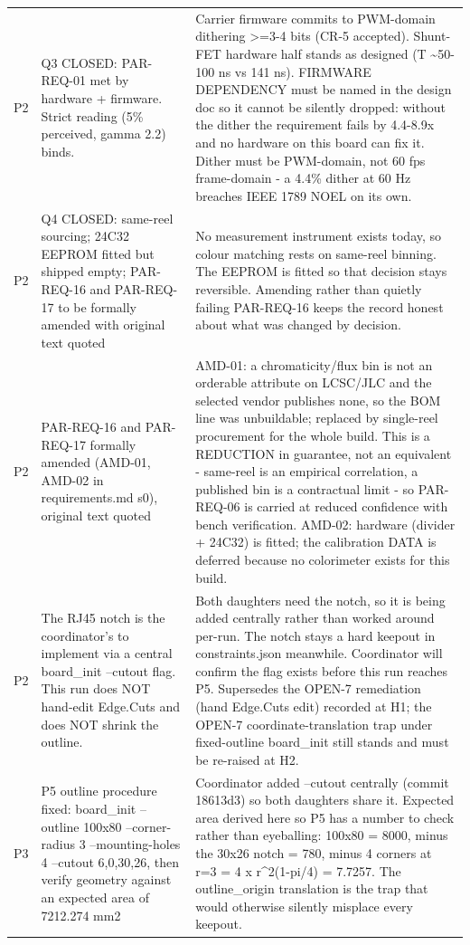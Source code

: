 \documentclass[11pt,a4paper]{article}
\begin{document}
{\begin{longtable}{lp{5.2cm}p{7.2cm}}
P2 & Q3 CLOSED: PAR-REQ-01 met by hardware + firmware. Strict reading (5\% perceived, gamma 2.2) binds. & Carrier firmware commits to PWM-domain dithering \textgreater{}=3-4 bits (CR-5 accepted). Shunt-FET hardware half stands as designed (T \textasciitilde{}50-100 ns vs 141 ns). FIRMWARE DEPENDENCY must be named in the design doc so it cannot be silently dropped: without the dither the requirement fails by 4.4-8.9x and no hardware on this board can fix it. Dither must be PWM-domain, not 60 fps frame-domain - a 4.4\% dither at 60 Hz breaches IEEE 1789 NOEL on its own. \\
P2 & Q4 CLOSED: same-reel sourcing; 24C32 EEPROM fitted but shipped empty; PAR-REQ-16 and PAR-REQ-17 to be formally amended with original text quoted & No measurement instrument exists today, so colour matching rests on same-reel binning. The EEPROM is fitted so that decision stays reversible. Amending rather than quietly failing PAR-REQ-16 keeps the record honest about what was changed by decision. \\
P2 & PAR-REQ-16 and PAR-REQ-17 formally amended (AMD-01, AMD-02 in requirements.md s0), original text quoted & AMD-01: a chromaticity/flux bin is not an orderable attribute on LCSC/JLC and the selected vendor publishes none, so the BOM line was unbuildable; replaced by single-reel procurement for the whole build. This is a REDUCTION in guarantee, not an equivalent - same-reel is an empirical correlation, a published bin is a contractual limit - so PAR-REQ-06 is carried at reduced confidence with bench verification. AMD-02: hardware (divider + 24C32) is fitted; the calibration DATA is deferred because no colorimeter exists for this build. \\
P2 & The RJ45 notch is the coordinator's to implement via a central board\_init --cutout flag. This run does NOT hand-edit Edge.Cuts and does NOT shrink the outline. & Both daughters need the notch, so it is being added centrally rather than worked around per-run. The notch stays a hard keepout in constraints.json meanwhile. Coordinator will confirm the flag exists before this run reaches P5. Supersedes the OPEN-7 remediation (hand Edge.Cuts edit) recorded at H1; the OPEN-7 coordinate-translation trap under fixed-outline board\_init still stands and must be re-raised at H2. \\
P3 & P5 outline procedure fixed: board\_init --outline 100x80 --corner-radius 3 --mounting-holes 4 --cutout 6,0,30,26, then verify geometry against an expected area of 7212.274 mm2 & Coordinator added --cutout centrally (commit 18613d3) so both daughters share it. Expected area derived here so P5 has a number to check rather than eyeballing: 100x80 = 8000, minus the 30x26 notch = 780, minus 4 corners at r=3 = 4 x r\textasciicircum{}2(1-pi/4) = 7.7257. The outline\_origin translation is the trap that would otherwise silently misplace every keepout. \\

\end{longtable}}
\end{document}
